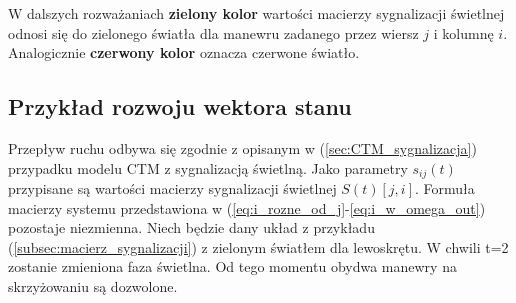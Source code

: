 \documentclass[12pt]{book}
\theoremstyle{plain}
\newcommand{\myref}[1]{(\ref{#1})}
\begin{document}
W dalszych rozważaniach {\color[rgb]{0,.70,0} \textbf{zielony kolor}} wartości macierzy sygnalizacji świetlnej odnosi się do zielonego światła dla manewru zadanego przez wiersz $j$ i kolumnę $i$. Analogicznie 
{\color[rgb]{.70,0,0} \textbf{czerwony kolor}} oznacza czerwone światło.
\subsection*{Przykład rozwoju wektora stanu} \label{sec:rozwoj_sieci_sygnalizcja_przypadek}
Przepływ ruchu odbywa się zgodnie z opisanym w \myref{sec:CTM_sygnalizacja} przypadku modelu CTM z sygnalizacją świetlną. Jako parametry $s_{ij}(t)$ przypisane są wartości macierzy sygnalizacji świetlnej $S(t)[j,i]$. Formuła macierzy systemu przedstawiona w 
(\ref{eq:i_rozne_od_j}-\ref{eq:i_w_omega_out}) pozostaje niezmienna. \newline
Niech będzie dany układ z przykładu \myref{subsec:macierz_sygnalizacji} z zielonym światłem dla lewoskrętu. W chwili t=2 zostanie zmieniona faza świetlna. Od tego momentu obydwa manewry na skrzyżowaniu są dozwolone.  
\def \xzero{\begin{bmatrix}
		9 \\ 4 \\ 3 \\ 0 \\ 1 \\ 5
\end{bmatrix}}
\def \xI{\begin{bmatrix}
		0 \\ 12 \\ 1 \\ 3 \\ 0 \\ 1
\end{bmatrix}}
\def \xII{\begin{bmatrix}
		0 \\ 9 \\ 3 \\ 1 \\ 0 \\ 0
\end{bmatrix}}
\def \xIII{\begin{bmatrix}
		0 \\ 0 \\ 2 \frac{1}{4} \\ 3 \\ 7 \frac{3}{4} \\ 0
\end{bmatrix}}
\end{document}
